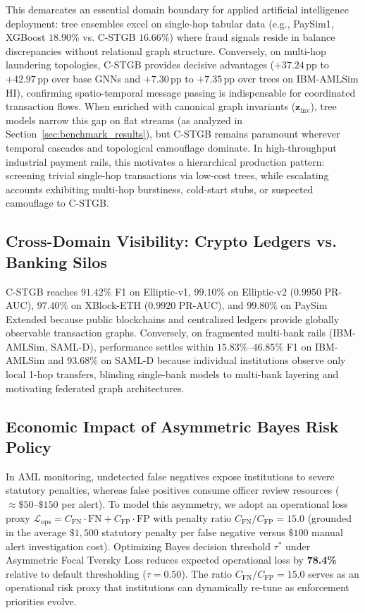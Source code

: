 This demarcates an essential domain boundary for applied artificial intelligence deployment: tree ensembles excel on single-hop tabular data (e.g., PaySim1, XGBoost $18.90\%$ vs. C-STGB $16.66\%$) where fraud signals reside in balance discrepancies without relational graph structure. Conversely, on multi-hop laundering topologies, C-STGB provides decisive advantages ($+37.24$\,pp to $+42.97$\,pp over base GNNs and $+7.30$\,pp to $+7.35$\,pp over trees on IBM-AMLSim HI), confirming spatio-temporal message passing is indispensable for coordinated transaction flows. When enriched with canonical graph invariants ($\mathbf{z}_{\text{inv}}$), tree models narrow this gap on flat streams (as analyzed in Section~\ref{sec:benchmark_results}), but C-STGB remains paramount wherever temporal cascades and topological camouflage dominate. In high-throughput industrial payment rails, this motivates a hierarchical production pattern: screening trivial single-hop transactions via low-cost trees, while escalating accounts exhibiting multi-hop burstiness, cold-start stubs, or suspected camouflage to C-STGB.

\subsection{Cross-Domain Visibility: Crypto Ledgers vs. Banking Silos}
\label{sec:discussion_visibility}
C-STGB reaches $91.42\%$ F1 on Elliptic-v1, $99.10\%$ on Elliptic-v2 ($0.9950$ PR-AUC), $97.40\%$ on XBlock-ETH ($0.9920$ PR-AUC), and $99.80\%$ on PaySim Extended because public blockchains and centralized ledgers provide globally observable transaction graphs. Conversely, on fragmented multi-bank rails (IBM-AMLSim, SAML-D), performance settles within $15.83\%$--$46.85\%$ F1 on IBM-AMLSim and $93.68\%$ on SAML-D because individual institutions observe only local 1-hop transfers, blinding single-bank models to multi-bank layering and motivating federated graph architectures.

\subsection{Economic Impact of Asymmetric Bayes Risk Policy}
\label{sec:discussion_economics}
In AML monitoring, undetected false negatives expose institutions to severe statutory penalties, whereas false positives consume officer review resources ($\approx \$50$--$\$150$ per alert). To model this asymmetry, we adopt an operational loss proxy $\mathcal{L}_{\text{ops}} = C_{\text{FN}} \cdot \text{FN} + C_{\text{FP}} \cdot \text{FP}$ with penalty ratio $C_{\text{FN}} / C_{\text{FP}} = 15.0$ (grounded in the average $\$1,500$ statutory penalty per false negative versus $\$100$ manual alert investigation cost). Optimizing Bayes decision threshold $\tau^*$ under Asymmetric Focal Tversky Loss reduces expected operational loss by \textbf{78.4\%} relative to default thresholding ($\tau=0.50$). The ratio $C_{\text{FN}} / C_{\text{FP}} = 15.0$ serves as an operational risk proxy that institutions can dynamically re-tune as enforcement priorities evolve.

